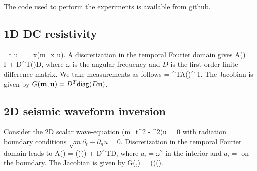 \documentclass{iopart}
\begin{document}
The code used to perform the experiments is available from \url{github}.

\subsection{1D DC resistivity}
\bq
\partial_t u = \partial_x(m\partial_x u).
\eq
A discretization in the temporal Fourier domain gives
\bq
A() = \imath\omega I + D^T()D,
\eq
where $\omega$ is the angular frequency and $D$ is the first-order finite-difference matrix. 
We take measurements as follows
\bq
{} = ^TA()^{-1}.
\eq
The Jacobian is given by $G(\mathbf{m},\mathbf{u}) = D^T\mathsf{diag}(D\mathbf{u})$. 

%

\subsection{2D seismic waveform inversion}
Consider the 2D scalar wave-equation
\bq
\left(m\partial_t^2 - \nabla^2\right)u = 0
\eq
with radiation boundary conditions $\sqrt{m}\partial_t - \partial_n u = 0$.
Discretization in the temporal Fourier domain leads to
\bq
A() = ()() + D^TD,
\eq
where $a_i = \omega^2$ in the interior and $a_i = $ on the boundary.
The Jacobian is given by
\bq
G(,) = ()().
\eq
\end{document}
